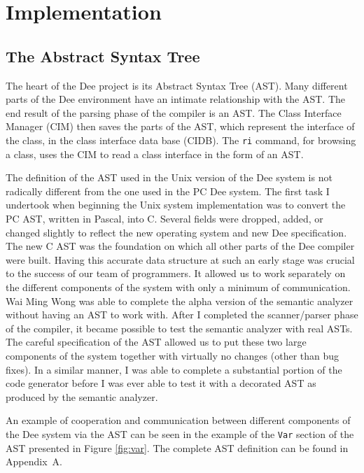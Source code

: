 \chapter{Implementation}

\section{The Abstract Syntax Tree}
 
The heart of the Dee project is its Abstract Syntax Tree (AST).  Many
different parts of the Dee environment have an intimate relationship
with the AST.  The end result of the parsing phase of the compiler is
an AST.  The Class Interface Manager (CIM) then saves the parts of the
AST, which represent the interface of the class, in the class
interface data base (CIDB).  The {\tt ri} command, for browsing a
class, uses the CIM to read a class interface in the form of an AST.

The definition of the AST used in the Unix version of the Dee system
is not radically different from the one used in the PC Dee system.
The first task I undertook when beginning the Unix system
implementation was to convert the PC AST, written in Pascal, into C.
Several fields were dropped, added, or changed slightly to reflect the
new operating system and new Dee specification.  The new C AST was the
foundation on which all other parts of the Dee compiler were built.
Having this accurate data structure at such an early stage was crucial
to the success of our team of programmers.  It allowed us to work
separately on the different components of the system with only a
minimum of communication.  Wai Ming Wong was able to complete the
alpha version of the semantic analyzer without having an AST to work
with.  After I completed the scanner/parser phase of the compiler, it
became possible to test the semantic analyzer with real ASTs.  The
careful specification of the AST allowed us to put these two large
components of the system together with virtually no changes (other
than bug fixes).  In a similar manner, I was able to complete a
substantial portion of the code generator before I was ever able to
test it with a decorated AST as produced by the semantic analyzer.

An example of cooperation and communication between different
components of the Dee system via the AST can be seen in the example of
the {\tt Var} section of the AST presented in Figure \ref{fig:var}.
The complete AST definition can be found in Appendix~A.

